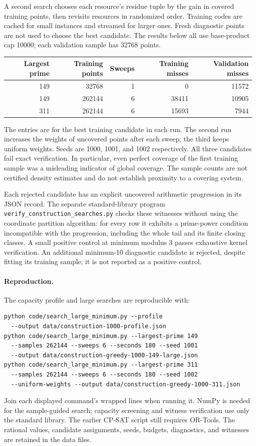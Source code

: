 \documentclass[11pt]{article}
\begin{document}
A second search chooses each resource's residue tuple by the gain in
covered training points, then revisits resources in randomized order.
Training codes are cached for small instances and streamed for larger
ones. Fresh diagnostic points are not used to choose the best candidate.
The results below all use base-product cap 10000; each validation sample
has 32768 points.
\begin{center}
\begin{tabular}{rrrrr}
\toprule
Largest prime & Training points & Sweeps & Training misses & Validation misses\\
\midrule
149 & 32768 & 1 & 0 & 11572\\
149 & 262144 & 6 & 38411 & 10905\\
311 & 262144 & 6 & 15693 & 7944\\
\bottomrule
\end{tabular}
\end{center}
The entries are for the best training candidate in each run. The second
run increases the weights of uncovered points after each sweep; the
third keeps uniform weights. Seeds are 1000, 1001, and 1002 respectively.
All three candidates fail exact verification. In particular, even perfect
coverage of the first training sample was a misleading indicator of
global coverage. The sample counts are not certified density estimates
and do not establish proximity to a covering system.

Each rejected candidate has an explicit uncovered arithmetic progression
in its JSON record. The separate standard-library program
\texttt{verify\_construction\_searches.py} checks these witnesses without
using the coordinate partition algorithm: for every row it exhibits a
prime-power condition incompatible with the progression, including the
whole tail and its finite closing classes. A small positive control at
minimum modulus 3 passes exhaustive kernel verification. An additional
minimum-10 diagnostic candidate is rejected, despite fitting its training
sample; it is not reported as a positive control.

\paragraph{Reproduction.}
The capacity profile and large searches are reproducible with:
\begin{verbatim}
python code/search_large_minimum.py --profile 
  --output data/construction-1000-profile.json
python code/search_large_minimum.py --largest-prime 149
  --samples 262144 --sweeps 6 --seconds 180 --seed 1001
  --output data/construction-greedy-1000-149-large.json
python code/search_large_minimum.py --largest-prime 311
  --samples 262144 --sweeps 6 --seconds 180 --seed 1002
  --uniform-weights --output data/construction-greedy-1000-311.json
\end{verbatim}
Join each displayed command's wrapped lines when running it. NumPy is
needed for the sample-guided search; capacity screening and witness
verification use only the standard library. The earlier CP-SAT script
still requires OR-Tools. The rational values, candidate assignments, seeds,
budgets, diagnostics, and witnesses are retained in the data files.
\end{document}
